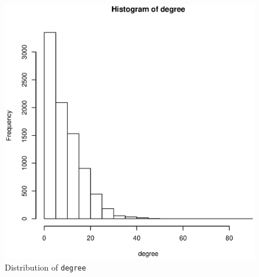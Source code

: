 \documentclass[11pt, fleqn]{article}
\begin{document}
\begin{figure}[!htb]
  \centering
  \includegraphics[scale=.5]{degrees.eps}
  \caption{Distribution of \texttt{degree}}
  \label{fig:degrees}
\end{figure}
\end{document}
